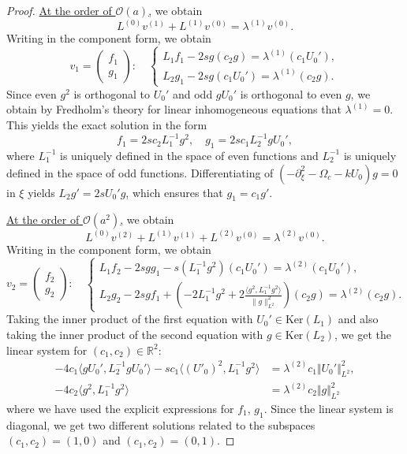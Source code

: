 \documentclass[12pt,reqno]{amsart}
\numberwithin{equation}{section}
\begin{document}
\begin{proof}
\underline{At the order of $\mathcal{O}(a)$,} we obtain 
\[
L^{(0)} v^{(1)} + L^{(1)} v^{(0)} =\lambda^{(1)} v^{(0)}.
\]
Writing in the component form, we obtain 
$$
v_1=\begin{pmatrix}f_1\\g_1\end{pmatrix} : \quad \left\{ \begin{array}{l} L_1 f_1 - 2 s g (c_2 g) = \lambda^{(1)} (c_1 U_0'), \\
L_2 g_1 - 2 s g (c_1 U_0') = \lambda^{(1)} (c_2 g). \end{array} \right.
$$
Since even $g^2$ is orthogonal to $U_0'$ and odd $g U_0'$ is orthogonal to even $g$, we obtain by Fredholm's theory 
for linear inhomogeneous equations that $\lambda^{(1)} = 0$. This yields the exact solution in the form 
$$
f_1 = 2 s c_2 L_1^{-1} g^2, \quad g_1 = 2 s c_1 L_2^{-1} g U_0',
$$
where $L_1^{-1}$ is uniquely defined in the space of even functions and $L_2^{-1}$ is uniquely defined in the space of odd functions. 
Differentiating of $(-\partial_{\xi}^2 - \Omega_c - k U_0) g = 0$ in $\xi$ yields $L_2 g' = 2 s U_0' g$, which ensures that 
$g_1 = c_1 g'$.

\underline{At the order of $\mathcal{O}(a^2)$,} we obtain 
\[
L^{(0)} v^{(2)} + L^{(1)} v^{(1)} + L^{(2)} v^{(0)} =\lambda^{(2)} v^{(0)}.
\]
Writing in the component form, we obtain 
$$
v_2=\begin{pmatrix}f_2\\g_2\end{pmatrix} : \quad \left\{ \begin{array}{l} L_1 f_2 - 2 s g g_1 - s  (L_1^{-1} g^2) (c_1 U_0') = \lambda^{(2)} (c_1 U_0'), \\
L_2 g_2 - 2 s g f_1 + \left( - 2 L_1^{-1} g^2 + 2 \frac{\langle g^2, L_1^{-1} g^2 \rangle}{\| g \|^2_{L^2}} \right) (c_2 g) = \lambda^{(2)} (c_2 g). \end{array} \right.
$$
Taking the inner product of the first equation with \(U_0'\in \text{Ker}(L_1)\) and 
also taking the inner product of the second equation with \(g\in \text{Ker}(L_2)\), we get the linear system 
for $(c_1,c_2) \in \mathbb{R}^2$:
\begin{align*}
-4 c_1 \langle g U_0', L_2^{-1} g U_0' \rangle - s c_1 \langle (U'_0)^2, L_{1}^{-1}g^2 \rangle &= \lambda^{(2)} c_1 \Vert U_{0}'\Vert^2_{L^2}, \\
-4c_2\langle g^2, L_{1}^{-1}g^2\rangle &= \lambda^{(2)} c_2 \Vert g\Vert^2_{L^2}
\end{align*}
where we have used the explicit expressions for $f_1$, $g_1$. Since the linear system is diagonal, we get two different solutions 
related to the subspaces $(c_1,c_2) = (1,0)$ and $(c_1,c_2) = (0,1)$. 


\end{proof}
\end{document}
